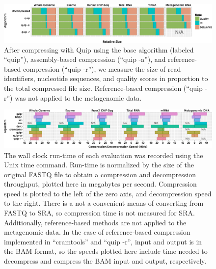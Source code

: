 \documentclass[a4,center,fleqn]{NAR}
\begin{document}
\begin{figure}
\centerline{\includegraphics[width=\textwidth]{relative_sizes.eps}}
\caption{
After compressing with Quip using the base algorithm (labeled ``quip''),
assembly-based compression (``quip -a''), and reference-based compression
(``quip -r''), we measure the size of read identifiers, nucleotide sequences,
and quality scores in proportion to the total compressed file size. Reference-based
compression (``quip -r'') was not applied to the metagenomic data.
}
\label{fig:relative_sizes}
\end{figure}



\begin{figure}
\centerline{\includegraphics[width=\textwidth]{comp_decomp_time.eps}}
\caption{
The wall clock run-time of each evaluation was recorded using the Unix time
command. Run-time is normalized by the size of the original FASTQ file to
obtain a compression and decompression throughput, plotted here in megabytes
per second. Compression speed is plotted to the left of the zero axis, and
decompression speed to the right. There is a not a convenient means of
converting from FASTQ to SRA, so compression time is not measured for SRA.
Additionally, reference-based methods are not applied to the metagenomic data.
In the case of reference-based compression implemented in ``cramtools'' and
``quip -r'', input and output is in the BAM format, so the speeds plotted here
include time needed to decompress and compress the BAM input and output,
respectively.
}
\label{fig:comp_decomp_time}
\end{figure}
\end{document}
